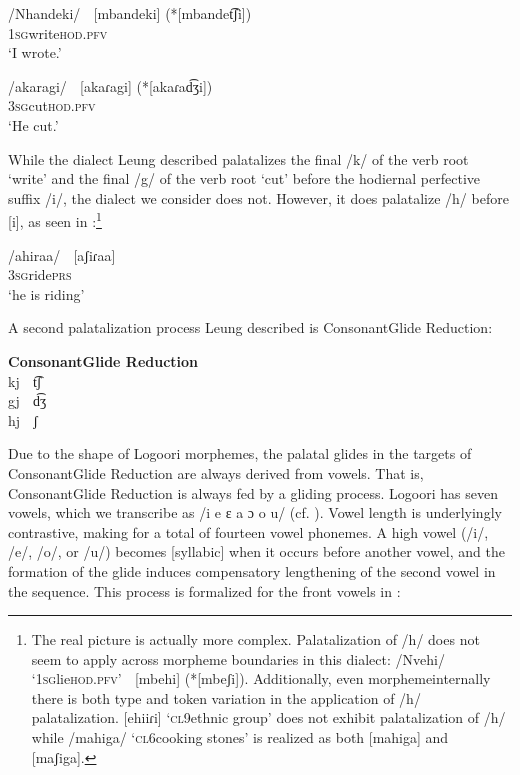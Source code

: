 \documentclass[output=paper]{langsci/langscibook}
\begin{document}
\ea{}
 /Nhandeki/    [mbandeki]  (*[mbandet͡ʃi])  \\{}
\textsc{1sg}write\textsc{hod.pfv}\\{}
\glt ‘I wrote.’
\z 

\ea{}
 /akaragi/    \textsc{[}akaɾagi]  (*[akaɾad͡ʒi])\\{}
\textsc{3sg}cut\textsc{hod.pfv}\\{}
\glt ‘He cut.’\\{}
\z

While the dialect Leung described palatalizes the final /k/ of the verb root ‘write’ and the final /g/ of the verb root ‘cut’ before the hodiernal perfective suffix /i/, the dialect we consider does not. However, it does palatalize /h/ before [i], as seen in :\footnote{The real picture is actually more complex. Palatalization of /h/ does not seem to apply across morpheme boundaries in this dialect: /Nvehi/ ‘1\textsc{sg}lie\textsc{hod.pfv}’  [mbehi] (*[mbeʃi]). Additionally, even morphemeinternally there is both type and token variation in the application of /h/ palatalization. [ehiiɾi] ‘\textsc{cl}9ethnic group’ does not exhibit palatalization of /h/ while /mahiga/ ‘\textsc{cl}6cooking stones’ is realized as both [mahiga] and [maʃiga].} 

\ea{}
 /ahiraa/    [aʃiɾaa]\\{}
\textsc{3sg}ride\textsc{prs}\\{}
\glt ‘he is riding’
\z

A second palatalization process Leung described is ConsonantGlide Reduction:

\ea{} 
 \textbf{Consonant}\textbf{Glide Reduction} \citep[116]{Leung1991}\\{}
kj  t͡ʃ \\{}
gj  d͡ʒ \\{}
hj  ʃ \\{}
\z

Due to the shape of Logoori morphemes, the palatal glides in the targets of ConsonantGlide Reduction are always derived from vowels. That is, ConsonantGlide Reduction is always fed by a gliding process. Logoori has seven vowels, which we transcribe as /i e ɛ a ɔ o u/ (cf. \citealt{Leung1991}). Vowel length is underlyingly contrastive, making for a total of fourteen vowel phonemes. A high vowel (/i/, /e/, /o/, or /u/) becomes [syllabic] when it occurs before another vowel, and the formation of the glide induces compensatory lengthening of the second vowel in the sequence. This process is formalized for the front vowels in :
\end{document}
